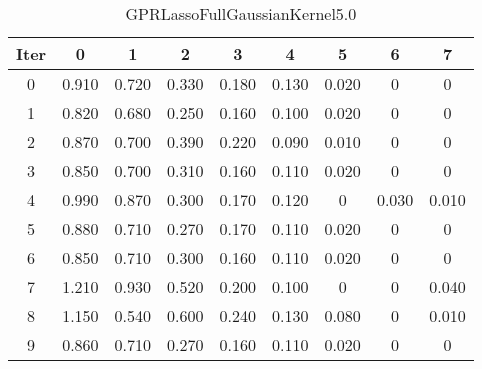 \begin{table}
	\begin{center}
		\begin{tabular}{|c|c|c|c|c|c|c|c|c|}
			\hline
			Iter & 0 & 1 & 2 & 3 & 4 & 5 & 6 & 7 \\
			\hline
			0 & 0.910 & 0.720 & 0.330 & 0.180 & 0.130 & 0.020 & 0 & 0 \\
			\hline
			1 & 0.820 & 0.680 & 0.250 & 0.160 & 0.100 & 0.020 & 0 & 0 \\
			\hline
			2 & 0.870 & 0.700 & 0.390 & 0.220 & 0.090 & 0.010 & 0 & 0 \\
			\hline
			3 & 0.850 & 0.700 & 0.310 & 0.160 & 0.110 & 0.020 & 0 & 0 \\
			\hline
			4 & 0.990 & 0.870 & 0.300 & 0.170 & 0.120 & 0 & 0.030 & 0.010 \\
			\hline
			5 & 0.880 & 0.710 & 0.270 & 0.170 & 0.110 & 0.020 & 0 & 0 \\
			\hline
			6 & 0.850 & 0.710 & 0.300 & 0.160 & 0.110 & 0.020 & 0 & 0 \\
			\hline
			7 & 1.210 & 0.930 & 0.520 & 0.200 & 0.100 & 0 & 0 & 0.040 \\
			\hline
			8 & 1.150 & 0.540 & 0.600 & 0.240 & 0.130 & 0.080 & 0 & 0.010 \\
			\hline
			9 & 0.860 & 0.710 & 0.270 & 0.160 & 0.110 & 0.020 & 0 & 0 \\
			\hline
		\end{tabular}
	\end{center}
	\caption{GPRLassoFullGaussianKernel5.0}
\end{table}